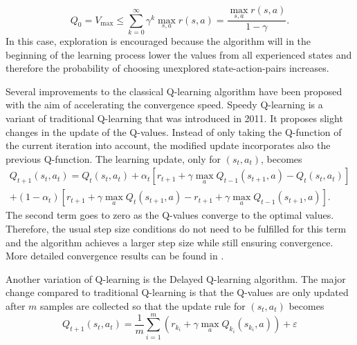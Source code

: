 \documentclass[../main.tex]{subfiles}
\begin{document}
\begin{equation}\label{eq:optimistic_init}
    Q_0 = V_{\max} \leq \sum_{k=0}^\infty \gamma^k\max_{s,a}r(s,a) = \dfrac{\max_{s,a}{r(s,a)}}{1-\gamma}.
\end{equation}
In this case, exploration is encouraged because the algorithm will in the beginning of the learning process lower the values from all experienced states and therefore the probability of choosing unexplored state-action-pairs increases. \par
Several improvements to the classical Q-learning algorithm have been proposed with the aim of accelerating the convergence speed. Speedy Q-learning is a variant of traditional Q-learning that was introduced in 2011. It proposes slight changes in the update of the Q-values. Instead of only taking the Q-function of the current iteration into account, the modified update incorporates also the previous Q-function. The learning update, only for $(s_t,a_t)$, becomes
\begin{multline}
Q_{t+1}(s_t,a_t) = Q_{t}(s_t,a_t) + \alpha_t \left[ r_{t+1}+\gamma \max_a Q_{t-1}(s_{t+1},a) - Q_{t}(s_t,a_t)\right] \\+ (1-\alpha_t) \left[ r_{t+1}+\gamma \max_a Q_{t}(s_{t+1},a) -  r_{t+1}+\gamma \max_a Q_{t-1}(s_{t+1},a)\right].
\end{multline}
The second term goes to zero as the Q-values converge to the optimal values. Therefore, the usual step size conditions do not need to be fulfilled for this term and the algorithm achieves a larger step size while still ensuring convergence. More detailed convergence results can be found in \cite{azar2011speedy}.\par
Another variation of Q-learning is the Delayed Q-learning algorithm. The major change compared to traditional Q-learning is that the Q-values are only updated after $m$ samples are collected so that the update rule for $(s_t,a_t)$ becomes
\begin{equation}\label{DelayedQ}
Q_{t+1}(s_t,a_t) = \dfrac{1}{m} \sum_{i=1}^m \left( r_{k_i} + \gamma \max_{a} Q_{k_i}(s_{k_i},a) \right) + \varepsilon
\end{equation}
\end{document}
